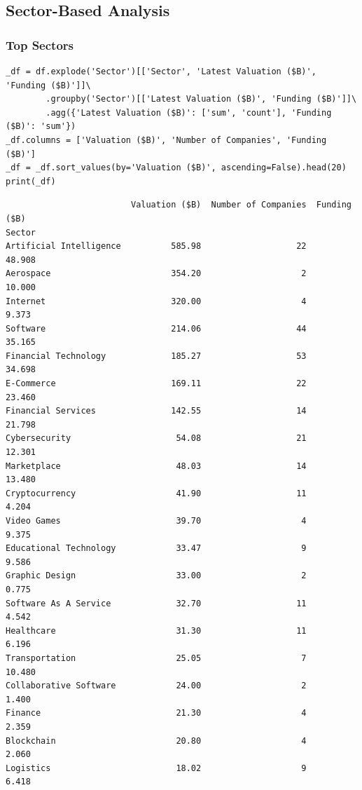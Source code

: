 \documentclass[a4paper,12pt]{article}
\begin{document}
\subsection{Sector-Based Analysis}
\label{sec:orgc4bd586}
\subsubsection{Top Sectors}
\label{sec:org997567b}
\begin{verbatim}
_df = df.explode('Sector')[['Sector', 'Latest Valuation ($B)', 'Funding ($B)']]\
        .groupby('Sector')[['Latest Valuation ($B)', 'Funding ($B)']]\
        .agg({'Latest Valuation ($B)': ['sum', 'count'], 'Funding ($B)': 'sum'})
_df.columns = ['Valuation ($B)', 'Number of Companies', 'Funding ($B)']
_df = _df.sort_values(by='Valuation ($B)', ascending=False).head(20)
print(_df)
\end{verbatim}

\label{}
\begin{verbatim}
                         Valuation ($B)  Number of Companies  Funding ($B)
Sector
Artificial Intelligence          585.98                   22        48.908
Aerospace                        354.20                    2        10.000
Internet                         320.00                    4         9.373
Software                         214.06                   44        35.165
Financial Technology             185.27                   53        34.698
E-Commerce                       169.11                   22        23.460
Financial Services               142.55                   14        21.798
Cybersecurity                     54.08                   21        12.301
Marketplace                       48.03                   14        13.480
Cryptocurrency                    41.90                   11         4.204
Video Games                       39.70                    4         9.375
Educational Technology            33.47                    9         9.586
Graphic Design                    33.00                    2         0.775
Software As A Service             32.70                   11         4.542
Healthcare                        31.30                   11         6.196
Transportation                    25.05                    7        10.480
Collaborative Software            24.00                    2         1.400
Finance                           21.30                    4         2.359
Blockchain                        20.80                    4         2.060
Logistics                         18.02                    9         6.418
\end{verbatim}
\end{document}
